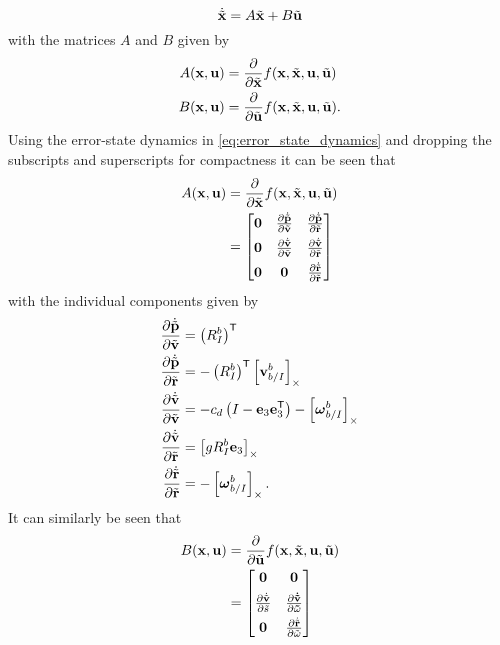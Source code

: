 \begin{equation}
\dot{\tilde{{\bf x}}}=A\tilde{{\bf x}}+B\tilde{{\bf u}}
\end{equation}
with the matrices $A$ and $B$ given by
\begin{align}
A({\bf x},{\bf u}) & =\frac{\partial}{\partial\tilde{{\bf x}}}f({\bf x},\tilde{{\bf x}},{\bf u},\tilde{{\bf u}})\\
B({\bf x},{\bf u}) & =\frac{\partial}{\partial\tilde{{\bf u}}}f({\bf x},\tilde{{\bf x}},{\bf u},\tilde{{\bf u}}).
\end{align}
Using the error-state dynamics in \eqref{eq:error_state_dynamics} and dropping
the subscripts and superscripts for compactness it can
be seen that
\begin{align}
A({\bf x},{\bf u}) & =\frac{\partial}{\partial\tilde{{\bf x}}}f({\bf x},\tilde{{\bf x}},{\bf u},\tilde{{\bf u}})\\
 & =\begin{bmatrix}{\bf 0} & \frac{\partial\dot{\tilde{{\bf
   p}}}}{\partial\tilde{{\bf v}}} & \frac{\partial\dot{\tilde{{\bf
   p}}}}{\partial\tilde{\boldsymbol{\mathrm{r}}}} \\[4pt]
{\bf 0} & \frac{\partial\dot{\tilde{{\bf v}}}}{\partial\tilde{{\bf v}}} &
\frac{\partial\dot{\tilde{{\bf v}}}}{\partial\tilde{\boldsymbol{\mathrm{r}}}} \\[4pt]
{\bf 0} & {\bf 0} & \frac{\partial\dot{\tilde{\boldsymbol{\mathrm{r}}}}}{\partial\tilde{\boldsymbol{\mathrm{r}}}}
\end{bmatrix}
\end{align}
with the individual components given by
\begin{align}
  \frac{\partial\dot{\tilde{\boldsymbol{\mathrm{p}}}}}{\partial\tilde{\boldsymbol{\mathrm{v}}}} &
  =\left(R_{I}^{b}\right)^{\mathsf{T}} \\
  \frac{\partial\dot{\tilde{\boldsymbol{\mathrm{p}}}}}{\partial\tilde{\boldsymbol{\mathrm{r}}}} &
  =-\left(R_{I}^{b}\right)^{\mathsf{T}} \left[ \boldsymbol{\mathrm{v}}_{b/I}^{b} \right]_{\times} \\
  \frac{\partial\dot{\tilde{\boldsymbol{\mathrm{v}}}}}{\partial\tilde{\boldsymbol{\mathrm{v}}}} & =
-c_d\left(I - \boldsymbol{\mathrm{e}}_3\boldsymbol{\mathrm{e}}_3^{\mathsf{T}}\right) - \left[ \boldsymbol{\mathrm{\omega}}_{b/I}^{b} \right]_{\times} \\
  \frac{\partial\dot{\tilde{\boldsymbol{\mathrm{v}}}}}{\partial\tilde{\boldsymbol{\mathrm{r}}}} & =
  \left[ gR_{I}^{b}\boldsymbol{\mathrm{e}}_3 \right]_{\times} \\
  \frac{\partial\dot{\tilde{\boldsymbol{\mathrm{r}}}}}{\partial\tilde{\boldsymbol{\mathrm{r}}}} & =
  -\left[ \boldsymbol{\mathrm{\omega}}_{b/I}^{b} \right]_{\times}.
\end{align}
It can similarly be seen that
\begin{align}
B({\bf x},{\bf u}) & =\frac{\partial}{\partial\tilde{{\bf u}}}f({\bf x},\tilde{{\bf x}},{\bf u},\tilde{{\bf u}})\\
                   & =\begin{bmatrix}{\bf 0} & {\bf 0}\\[4pt]
\frac{\partial\dot{\tilde{{\bf v}}}}{\partial\tilde{s}} & {\bf
\frac{\partial\dot{\tilde{{\bf v}}}}{\partial\tilde{\omega}}}\\[4pt]
{\bf 0} & \frac{\partial\dot{\tilde{\boldsymbol{\mathrm{r}}}}}{\partial\tilde{\omega}}
\end{bmatrix}
\end{align}
